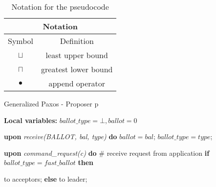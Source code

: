 \begin{table}[h!]
	\renewcommand{\arraystretch}{1.5}
	\centering
	\begin{tabular}{ |c|c|}
		\hline
		\multicolumn{2}{|c|}{Notation}\\
		\hline
		Symbol & Definition \\
		\hline
		$\sqcup$ & least upper bound \\
		\hline
		$\sqcap$ & greatest lower bound \\
		\hline
		$\bullet$ & append operator \\
		\hline
	\end{tabular} 
	\caption{Notation for the pseudocode} 
	\label{table:1}
\end{table}

\begin{algorithm}[h] 
	\caption{Generalized Paxos - Proposer p}
	\textbf{Local variables:} $ballot\_type = \bot, ballot = 0 $
	\begin{algorithmic}[1]
		
		\State \textbf{upon} \textit{receive(BALLOT, bal, type)} \textbf{do} 
		\State \hspace{\algorithmicindent} 
		$ballot = bal$;
		\State \hspace{\algorithmicindent} 
		$ballot\_type = type$;
		\State
		
		\State \textbf{upon} \textit{command\_request(c)} \textbf{do}   \hspace{\algorithmicindent}\hspace{\algorithmicindent}\hspace{\algorithmicindent}\# receive request from application
		\State \hspace{\algorithmicindent} \textbf{if} $ballot\_type = fast\_ballot$ \textbf{then}

		\State \hspace{\algorithmicindent}\hspace{\algorithmicindent}  to acceptors;
		\State \hspace{\algorithmicindent} \textbf{else} 
		\State \hspace{\algorithmicindent}\hspace{\algorithmicindent}  to leader;		
	\end{algorithmic}
\end{algorithm}

